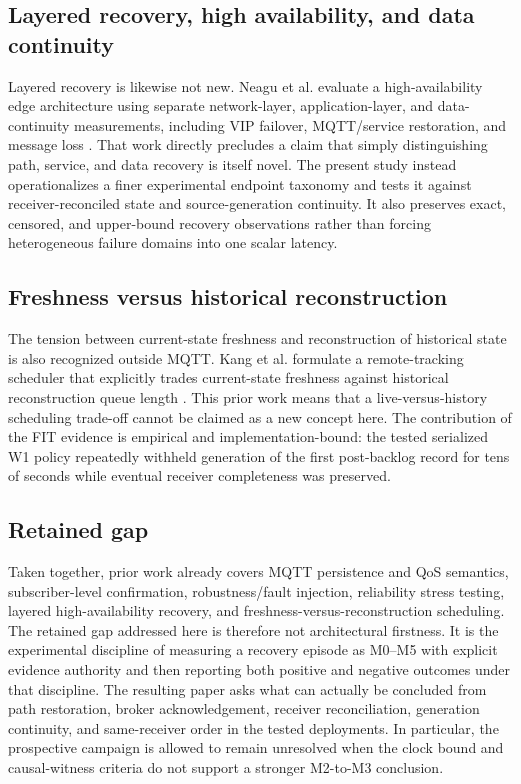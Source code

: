 \documentclass[journal]{IEEEtran}
\begin{document}
\subsection{Layered recovery, high availability, and data continuity}

Layered recovery is likewise not new. Neagu et al. evaluate a high-availability edge architecture using separate network-layer, application-layer, and data-continuity measurements, including VIP failover, MQTT/service restoration, and message loss \cite{neagu2026}. That work directly precludes a claim that simply distinguishing path, service, and data recovery is itself novel. The present study instead operationalizes a finer experimental endpoint taxonomy and tests it against receiver-reconciled state and source-generation continuity. It also preserves exact, censored, and upper-bound recovery observations rather than forcing heterogeneous failure domains into one scalar latency.

\subsection{Freshness versus historical reconstruction}

The tension between current-state freshness and reconstruction of historical state is also recognized outside MQTT. Kang et al. formulate a remote-tracking scheduler that explicitly trades current-state freshness against historical reconstruction queue length \cite{kang2026}. This prior work means that a live-versus-history scheduling trade-off cannot be claimed as a new concept here. The contribution of the FIT evidence is empirical and implementation-bound: the tested serialized W1 policy repeatedly withheld generation of the first post-backlog record for tens of seconds while eventual receiver completeness was preserved.

\subsection{Retained gap}

Taken together, prior work already covers MQTT persistence and QoS semantics, subscriber-level confirmation, robustness/fault injection, reliability stress testing, layered high-availability recovery, and freshness-versus-reconstruction scheduling. The retained gap addressed here is therefore not architectural firstness. It is the experimental discipline of measuring a recovery episode as M0--M5 with explicit evidence authority and then reporting both positive and negative outcomes under that discipline. The resulting paper asks what can actually be concluded from path restoration, broker acknowledgement, receiver reconciliation, generation continuity, and same-receiver order in the tested deployments. In particular, the prospective campaign is allowed to remain unresolved when the clock bound and causal-witness criteria do not support a stronger M2-to-M3 conclusion.
\end{document}
